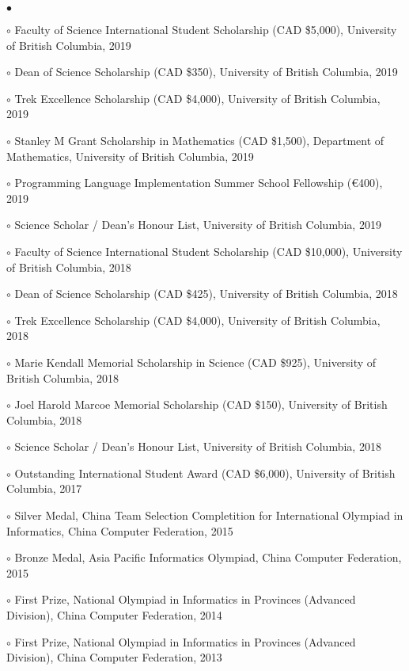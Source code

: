 \documentclass[margin,line]{res}
\newenvironment{list2}{
  \begin{list}{$\bullet$}{%
      \setlength{\itemsep}{0in}
      \setlength{\parsep}{0in} \setlength{\parskip}{0in}
      \setlength{\topsep}{0in} \setlength{\partopsep}{0in}
      \setlength{\leftmargin}{0.2in}}}{\end{list}}
\begin{document}
\begin{resume}
\begin{list2}
\item[$\circ$] Faculty of Science International Student Scholarship (CAD \$5,000), University of British Columbia, 2019
\item[$\circ$] Dean of Science Scholarship (CAD \$350), University of British Columbia, 2019
\item[$\circ$] Trek Excellence Scholarship (CAD \$4,000), University of British Columbia, 2019
\item[$\circ$] Stanley M Grant Scholarship in Mathematics (CAD \$1,500), Department of Mathematics, University of British Columbia, 2019
\item[$\circ$] Programming Language Implementation Summer School Fellowship (€400), 2019
\item[$\circ$] Science Scholar / Dean's Honour List, University of British Columbia, 2019
\item[$\circ$] Faculty of Science International Student Scholarship (CAD \$10,000), University of British Columbia, 2018
\item[$\circ$] Dean of Science Scholarship (CAD \$425), University of British Columbia, 2018
\item[$\circ$] Trek Excellence Scholarship (CAD \$4,000), University of British Columbia, 2018
\item[$\circ$] Marie Kendall Memorial Scholarship in Science (CAD \$925), University of British Columbia, 2018
\item[$\circ$] Joel Harold Marcoe Memorial Scholarship (CAD \$150), University of British Columbia, 2018
\item[$\circ$] Science Scholar / Dean's Honour List, University of British Columbia, 2018 
\item[$\circ$] Outstanding International Student Award (CAD \$6,000), University of British Columbia, 2017
\item[$\circ$] Silver Medal, China Team Selection Completition for International Olympiad in Informatics, China Computer Federation, 2015
\item[$\circ$] Bronze Medal, Asia Pacific Informatics Olympiad, China Computer Federation, 2015
\item[$\circ$] First Prize, National Olympiad in Informatics in Provinces (Advanced Division), China Computer Federation, 2014
\item[$\circ$] First Prize, National Olympiad in Informatics in Provinces (Advanced Division), China Computer Federation, 2013
\end{list2}



\end{resume}
\end{document}
